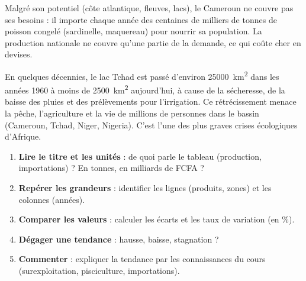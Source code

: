 \documentclass[11pt]{article}
\newcommand{\cle}[1]{{\popxbold\color{popdark}#1}}
\begin{document}
\begin{exemplebox}
Malgré son potentiel (côte atlantique, fleuves, lacs), le Cameroun ne couvre pas ses besoins : il importe chaque année des \cle{centaines de milliers de tonnes} de poisson congelé (sardinelle, maquereau) pour nourrir sa population. La production nationale ne couvre qu'une partie de la demande, ce qui coûte cher en devises.
\end{exemplebox}

\begin{savaistu}
En quelques décennies, le lac Tchad est passé d'environ \SI{25000}{km^2} dans les années 1960 à \cle{moins de \SI{2500}{km^2}} aujourd'hui, à cause de la sécheresse, de la baisse des pluies et des prélèvements pour l'irrigation. Ce rétrécissement menace la pêche, l'agriculture et la vie de millions de personnes dans le bassin (Cameroun, Tchad, Niger, Nigeria). C'est l'une des plus graves crises écologiques d'Afrique.
\end{savaistu}

\begin{methode}
\begin{enumerate}
\item \textbf{Lire le titre et les unités} : de quoi parle le tableau (production, importations) ? En tonnes, en milliards de FCFA ?
\item \textbf{Repérer les grandeurs} : identifier les lignes (produits, zones) et les colonnes (années).
\item \textbf{Comparer les valeurs} : calculer les écarts et les taux de variation (en \%).
\item \textbf{Dégager une tendance} : hausse, baisse, stagnation ?
\item \textbf{Commenter} : expliquer la tendance par les connaissances du cours (surexploitation, pisciculture, importations).
\end{enumerate}
\end{methode}
\end{document}

